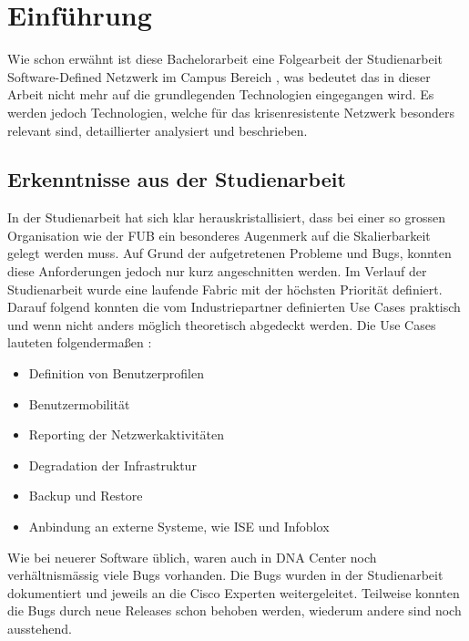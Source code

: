 \section{Einführung}

Wie schon erwähnt ist diese Bachelorarbeit eine Folgearbeit der Studienarbeit Software-Defined Netzwerk im Campus Bereich \cite{studienarbeit}, was bedeutet das in dieser Arbeit nicht mehr auf die grundlegenden Technologien eingegangen wird. Es werden jedoch Technologien, welche für das krisenresistente Netzwerk besonders relevant sind, detaillierter analysiert und beschrieben. 

\subsection{Erkenntnisse aus der Studienarbeit}

In der Studienarbeit hat sich klar herauskristallisiert, dass bei einer so grossen Organisation wie der FUB ein besonderes Augenmerk auf die Skalierbarkeit gelegt werden muss. Auf Grund der aufgetretenen Probleme und Bugs, konnten diese Anforderungen jedoch nur kurz angeschnitten werden. Im Verlauf der Studienarbeit wurde eine laufende Fabric mit der höchsten Priorität definiert. Darauf folgend konnten die vom Industriepartner definierten Use Cases praktisch und wenn nicht anders möglich theoretisch abgedeckt werden. Die Use Cases lauteten folgendermaßen \cite{studienarbeit}:

\begin{itemize}
	\item Definition von Benutzerprofilen
	\item Benutzermobilität
	\item Reporting der Netzwerkaktivitäten
	\item Degradation der Infrastruktur
	\item Backup und Restore
	\item Anbindung an externe Systeme, wie ISE und Infoblox
\end{itemize}


Wie bei neuerer Software üblich, waren auch in DNA Center noch verhältnismässig viele
Bugs vorhanden. Die Bugs wurden in der Studienarbeit dokumentiert und jeweils an die Cisco
Experten weitergeleitet. Teilweise konnten die Bugs durch neue Releases schon behoben werden, wiederum andere sind noch ausstehend. 


